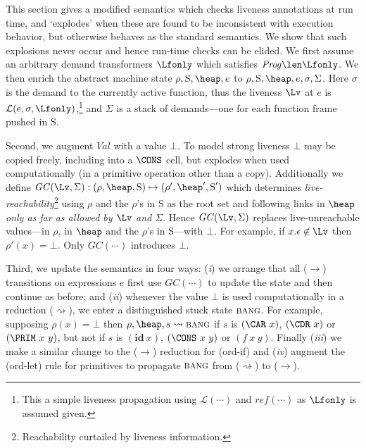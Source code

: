 \documentclass{llncs}
\newcommand{\stk}{\mbox{S}}       %
\newcommand{\ID}{\mbox{$\mathbf{ id}$}} %
\newcommand{\bang}{\mbox{\sc bang}}
\begin{document}
This section gives a modified semantics
which checks liveness annotations
at run time, and `explodes' when these are found to be inconsistent with execution behavior,
but otherwise behaves as the standard semantics.
We show that such explosions never occur and hence run-time checks
can be elided.
We first assume an arbitrary  demand transformers $\Lfonly$ which satisfies
$\mathit{Prog} \len \Lfonly$.
We then enrich the abstract machine state $\rho, \stk, \heap, e$ to
$\rho, \stk, \heap, e, \sigma, \Sigma$.
Here $\sigma$ is the demand to the currently active function,
thus the liveness $\Lv$ at $e$ is $\mathcal{L}(e,\sigma,\Lfonly)$,\footnote{
This a simple liveness propagation using $\mathcal{L}(\cdots)$
and $\mathit{ref}(\cdots)$ as $\Lfonly$ is assumed given.}
and $\Sigma$ is a stack of demands---one for each function frame
pushed in $\stk$.

Second, we augment $\mathit{Val}$ with a value $\bot$.
To model strong liveness $\bot$ may be copied freely,
including into a $\CONS$ cell,
but explodes
when used computationally (in a primitive operation other than a copy).
Additionally we define
$\mathit{GC}(\Lv,\Sigma): (\rho, \heap, \stk) \mapsto (\rho', \heap', \stk')$
which determines {\em live-reachability}\footnote{Reachability curtailed by liveness information.}
using $\rho$ and the $\rho$'s in $\stk$ as the root set
and following links in $\heap$ {\em only as far as allowed by $\Lv$ and $\Sigma$}.
Hence $\mathit{GC}(\Lv,\Sigma)$ replaces
live-unreachable values---in $\rho$, in $\heap$ and the $\rho$'s in \stk---with $\bot$.
For example, if $x.\epsilon \not\in \Lv$ then $\rho'(x) = \bot$.
Only $\mathit{GC}(\cdots)$ introduces $\bot$.

Third, we update the semantics in four ways: ({\em i\/}) we arrange that all
($\rightarrow$) transitions on expressions $e$ first use $\mathit{GC}(\cdots)$
to update the state and then continue as before;
and ({\em ii\/}) whenever the value $\bot$ is used computationally in a reduction
($\rightsquigarrow$), we enter a distinguished stuck state $\bang$.
For example, supposing $\rho(x)=\bot$
then
$\rho, \heap, s \rightsquigarrow \bang$ if $s$ is
$(\CAR\,\, x)$, $(\CDR\,\, x)$ or $(\PRIM\,\, x\ y)$,
but not if $s$ is $(\ID~x)$, $(\CONS~x~y)$ or $(f~x~y)$.
Finally ({\em iii\/}) we make a similar change to the ($\rightarrow$) reduction for ({\sc ord-if})
and ({\em iv\/}) augment the ({\sc ord-let}) rule for primitives to propagate
$\bang$ from ($\rightsquigarrow$) to ($\rightarrow$).
\end{document}
